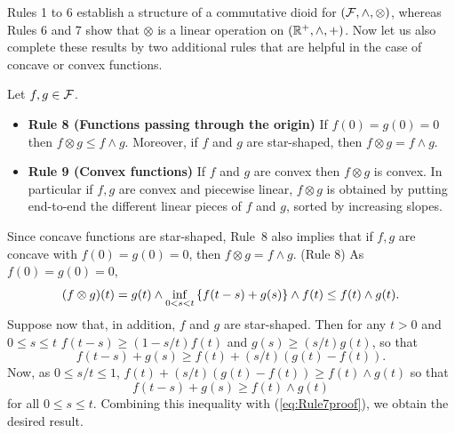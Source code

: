 Rules 1 to 6 establish a structure of a commutative dioid for
$(\mathcal F, \wedge, \otimes)$, whereas Rules 6 and 7 show that
$\otimes$ is a linear operation on $(\mathbb{R}^{+}, \wedge, +)$. Now
let us also complete these results by two additional rules that
are helpful in the case of concave or convex functions.
\begin{theorem}
Let $f,g \in \mathcal F$.
\begin{itemize}
\item{\textbf{Rule 8 (Functions passing through the origin)} If $f(0) = g(0) = 0$
then $f \otimes g \leq f \wedge g$. Moreover, if $f$ and $g$ are star-shaped,
then $f \otimes g = f \wedge g$.}
\item{\textbf{Rule 9 (Convex functions)}
If $f$ and $g$ are convex then $f \otimes g$ is convex. In particular if $f, g$
are convex and piecewise linear, $f \otimes g$ is obtained by putting end-to-end the different
linear pieces of $f$ and $g$, sorted by increasing slopes.}
\end{itemize}
\end{theorem}
Since concave functions are star-shaped, Rule~8 also implies that if $f,g$ are concave with $f(0) = g(0) =0$, then  $f \otimes g = f \wedge g$.
\pr (Rule 8) As $f(0) = g(0) = 0$,
\begin{equation}
\mylabel{eq:Rule7proof}
(f \otimes g)(t) = g(t) \wedge \inf_{0 < s < t} \left\{ f(t-s) + g(s)  \right\} \wedge f(t) \leq f(t) \wedge g(t).
\end{equation}
Suppose now that, in addition, $f$ and $g$ are star-shaped. Then for any $t > 0$ and $0 \leq s \leq t$
$f(t-s) \geq (1-s/t)f(t)$ and $g(s) \geq (s/t)g(t) $, so that
$$ f(t-s) + g(s) \geq f(t) + (s/t) (g(t) - f(t)). $$
Now, as $0 \leq s/t \leq 1$, $ f(t) + (s/t) (g(t) - f(t)) \geq f(t) \wedge g(t)$ so that
$$ f(t-s) + g(s) \geq f(t) \wedge g(t) $$
for all $0 \leq s \leq t$. Combining this inequality with (\ref{eq:Rule7proof}), we obtain the desired result.
